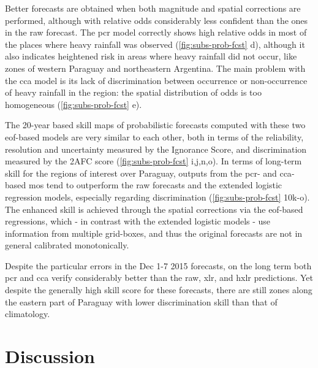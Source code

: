 \documentclass{ametsoc}
\begin{document}
Better forecasts are obtained when both magnitude and spatial corrections are performed, although with relative odds considerably less confident than the ones in the raw forecast.
The \gls{pcr} model correctly shows high relative odds in most of the places where heavy rainfall was observed (\cref{fig:subs-prob-fcst} d), although it also indicates heightened risk in areas where heavy rainfall did not occur, like zones of western Paraguay and northeastern Argentina.
The main problem with the \gls{cca} model is its lack of discrimination between occurrence or non-occurrence of heavy rainfall in the region: the spatial distribution of odds is too homogeneous (\cref{fig:subs-prob-fcst} e).

The 20-year based skill maps of probabilistic forecasts computed with these two \gls{eof}-based models are very similar to each other, both in terms of the reliability, resolution and uncertainty measured by the Ignorance Score, and discrimination measured by the 2AFC score (\cref{fig:subs-prob-fcst} i,j,n,o).
In terms of long-term skill for the regions of interest over Paraguay, outputs from the \gls{pcr}- and \gls{cca}-based \gls{mos} tend to outperform the raw forecasts and the extended logistic regression models, especially regarding discrimination (\cref{fig:subs-prob-fcst} 10k-o).
The enhanced skill is achieved through the spatial corrections via the \gls{eof}-based regressions, which - in contrast with the extended logistic models - use information from multiple grid-boxes, and thus the original forecasts are not in general calibrated monotonically.

Despite the particular errors in the Dec 1-7 2015 forecasts, on the long term both \gls{pcr} and \gls{cca} verify considerably better than the raw, \gls{xlr}, and \gls{hxlr} predictions.
Yet despite the generally high skill score for these forecasts, there are still zones along the eastern part of Paraguay with lower discrimination skill than that of climatology.


\section{Discussion}
\label{sec:discussion}
\end{document}
